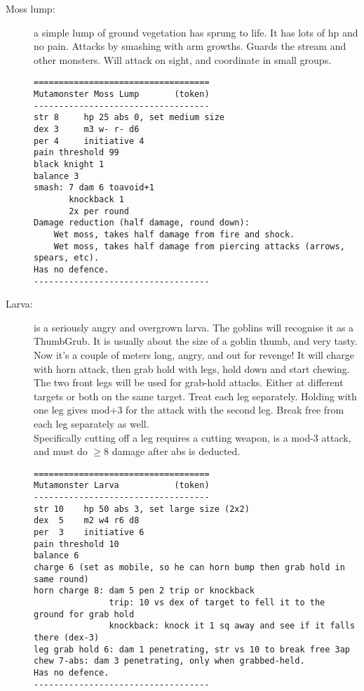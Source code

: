 \begin{description}
\item[Moss lump:] a simple lump of ground vegetation has sprung to life. It has lots of hp and no pain. Attacks by smashing with arm growths. Guards the stream and other monsters. Will attack on sight, and coordinate in small groups.
\goodbreak \begin{samepage} \small \begin{verbatim}
===================================
Mutamonster Moss Lump       (token)
-----------------------------------
str 8     hp 25 abs 0, set medium size
dex 3     m3 w- r- d6
per 4     initiative 4
pain threshold 99
black knight 1
balance 3
smash: 7 dam 6 toavoid+1
       knockback 1
       2x per round
Damage reduction (half damage, round down):
    Wet moss, takes half damage from fire and shock.
    Wet moss, takes half damage from piercing attacks (arrows, spears, etc).
Has no defence.
-----------------------------------
\end{verbatim} \normalsize \end{samepage}

\item[Larva:] is a seriously angry and overgrown larva. The goblins will recognise it as a ThumbGrub. It is usually about the size of a goblin thumb, and very tasty. Now it's a couple of meters long, angry, and out for revenge!
It will charge with horn attack, then grab hold with legs, hold down and start chewing. The two front legs will be used for grab-hold attacks. Either at different targets or both on the same target. Treat each leg separately. Holding with one leg gives mod+3 for the attack with the second leg. Break free from each leg separately as well.\\
Specifically cutting off a leg requires a cutting weapon, is a mod-3 attack, and must do $\geq$8 damage after abs is deducted.
\goodbreak \begin{samepage} \small \begin{verbatim}
===================================
Mutamonster Larva           (token)
-----------------------------------
str 10    hp 50 abs 3, set large size (2x2)
dex  5    m2 w4 r6 d8
per  3    initiative 6
pain threshold 10
balance 6
charge 6 (set as mobile, so he can horn bump then grab hold in same round)
horn charge 8: dam 5 pen 2 trip or knockback
               trip: 10 vs dex of target to fell it to the ground for grab hold
               knockback: knock it 1 sq away and see if it falls there (dex-3)
leg grab hold 6: dam 1 penetrating, str vs 10 to break free 3ap
chew 7-abs: dam 3 penetrating, only when grabbed-held.
Has no defence.
-----------------------------------
\end{verbatim} \normalsize \end{samepage}


\end{description}
